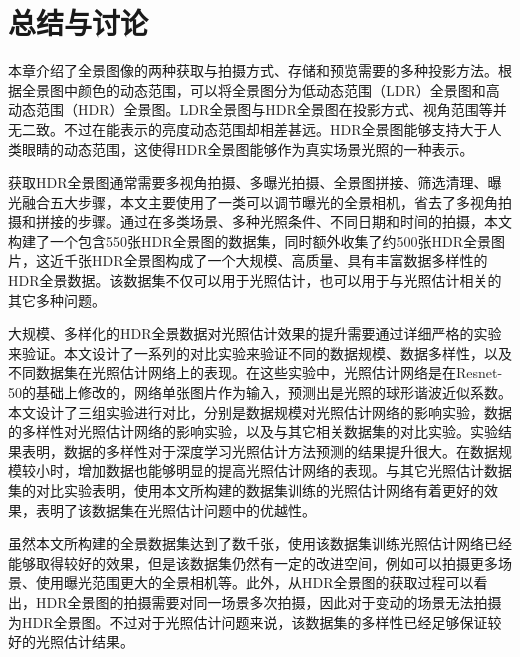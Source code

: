 \section{总结与讨论}
本章介绍了全景图像的两种获取与拍摄方式、存储和预览需要的多种投影方法。根据全景图中颜色的动态范围，可以将全景图分为低动态范围（LDR）全景图和高动态范围（HDR）全景图。LDR全景图与HDR全景图在投影方式、视角范围等并无二致。不过在能表示的亮度动态范围却相差甚远。HDR全景图能够支持大于人类眼睛的动态范围，这使得HDR全景图能够作为真实场景光照的一种表示。

获取HDR全景图通常需要多视角拍摄、多曝光拍摄、全景图拼接、筛选清理、曝光融合五大步骤，本文主要使用了一类可以调节曝光的全景相机，省去了多视角拍摄和拼接的步骤。通过在多类场景、多种光照条件、不同日期和时间的拍摄，本文构建了一个包含550张HDR全景图的数据集，同时额外收集了约500张HDR全景图片，这近千张HDR全景图构成了一个大规模、高质量、具有丰富数据多样性的HDR全景数据。该数据集不仅可以用于光照估计，也可以用于与光照估计相关的其它多种问题。

大规模、多样化的HDR全景数据对光照估计效果的提升需要通过详细严格的实验来验证。本文设计了一系列的对比实验来验证不同的数据规模、数据多样性，以及不同数据集在光照估计网络上的表现。在这些实验中，光照估计网络是在Resnet-50的基础上修改的，网络单张图片作为输入，预测出是光照的球形谐波近似系数。本文设计了三组实验进行对比，分别是数据规模对光照估计网络的影响实验，数据的多样性对光照估计网络的影响实验，以及与其它相关数据集的对比实验。实验结果表明，数据的多样性对于深度学习光照估计方法预测的结果提升很大。在数据规模较小时，增加数据也能够明显的提高光照估计网络的表现。与其它光照估计数据集的对比实验表明，使用本文所构建的数据集训练的光照估计网络有着更好的效果，表明了该数据集在光照估计问题中的优越性。

虽然本文所构建的全景数据集达到了数千张，使用该数据集训练光照估计网络已经能够取得较好的效果，但是该数据集仍然有一定的改进空间，例如可以拍摄更多场景、使用曝光范围更大的全景相机等。此外，从HDR全景图的获取过程可以看出，HDR全景图的拍摄需要对同一场景多次拍摄，因此对于变动的场景无法拍摄为HDR全景图。不过对于光照估计问题来说，该数据集的多样性已经足够保证较好的光照估计结果。